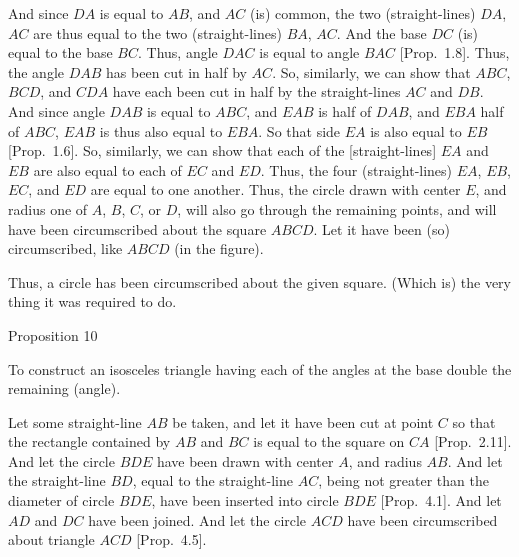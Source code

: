 And since $DA$ is equal to $AB$, and $AC$ (is) common, the two (straight-lines)
$DA$, $AC$ are thus equal to the two (straight-lines) $BA$, $AC$. And the base $DC$
(is) equal to the base $BC$. Thus, angle $DAC$ is equal to angle $BAC$ [Prop.~1.8]. Thus, the angle $DAB$ has been cut in half by $AC$. So, similarly,
we can show that $ABC$, $BCD$, and $CDA$ have each been cut in half
by the straight-lines $AC$ and $DB$. And since angle $DAB$ is equal
 to $ABC$, and $EAB$ is half of $DAB$, and $EBA$ half of $ABC$, $EAB$ is thus
 also equal to $EBA$. So that side $EA$ is also equal to  $EB$ [Prop.~1.6]. So, similarly, we can show that each of the [straight-lines] $EA$ and $EB$ are also equal to each of $EC$ and $ED$. Thus, the four (straight-lines)
 $EA$, $EB$, $EC$, and $ED$ are equal to one another. Thus, the circle drawn with
 center $E$, and radius one of $A$, $B$, $C$, or $D$, will also go through the remaining points, and will have been circumscribed about the square $ABCD$. Let
 it have been (so) circumscribed, like $ABCD$ (in the figure).
 
 Thus, a circle has been circumscribed about the given square.
 (Which is) the very thing it was required to do.


\begin{center}
{\large Proposition 10}
\end{center}

To construct an isosceles triangle having each of the angles at the base
double the remaining (angle).

Let some straight-line $AB$ be taken, and let it have been cut at point $C$
so that the rectangle contained by $AB$ and $BC$ is equal to the square
on $CA$ [Prop.~2.11]. And let the circle $BDE$ have been drawn with
center $A$, and radius $AB$. And let the straight-line $BD$, equal to the straight-line $AC$, being not greater than the diameter of circle $BDE$, have been inserted into circle $BDE$ [Prop.~4.1]. And let $AD$ and $DC$ have been joined. 
And let the circle $ACD$ have been circumscribed about triangle $ACD$ [Prop.~4.5].

\epsfysize=2.2in
\centerline{}

